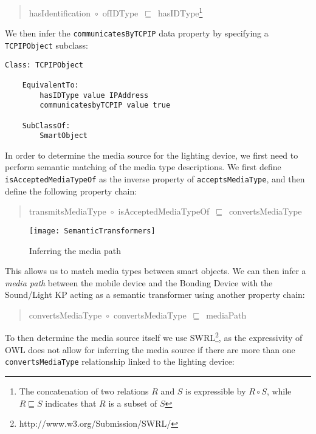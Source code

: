 \begin{quote}
hasIdentification~\ensuremath{\circ}~ofIDType~\ensuremath{\sqsubseteq}~hasIDType\footnote{The concatenation of two relations $R$ and $S$ is expressible by $R \circ S $, while $ R \sqsubseteq S$ indicates that $R$ is a subset of $S$ }
\end{quote}

\noindent We then infer the \texttt{communicatesByTCPIP} data property by specifying a \texttt{TCPIPObject} subclass:

\begin{verbatim}
Class: TCPIPObject

    EquivalentTo:
        hasIDType value IPAddress
        communicatesbyTCPIP value true 

    SubClassOf:
        SmartObject
\end{verbatim}

In order to determine the media source for the lighting device, we first need to  perform semantic matching of the media type descriptions. We first define \texttt{isAccepted\-MediaTypeOf} as the inverse property of \texttt{acceptsMediaType}, and then define the following property chain:

\begin{quote}
transmitsMediaType~\ensuremath{\circ}~isAcceptedMediaTypeOf~\ensuremath{\sqsubseteq}~convertsMediaType
\end{quote}

\begin{figure}
\centering
\texttt{[image: SemanticTransformers]}
\caption{Inferring the media path}
\label{mediapath}
\end{figure}

This allows us to match media types between smart objects. We can then infer a \textit{media path} between the mobile device and the Bonding Device with the Sound/Light KP acting as a semantic transformer using another property chain:

\begin{quote}
convertsMediaType~\ensuremath{\circ}~convertsMediaType~\ensuremath{\sqsubseteq}~mediaPath
\end{quote}

\noindent To then determine the media source itself we use \ac{SWRL}\footnote{http://www.w3.org/Submission/SWRL/}, as the expressivity of \ac{OWL} does not allow for inferring the media source if there are more than one \texttt{convertsMediaType} relationship linked to the lighting device:

